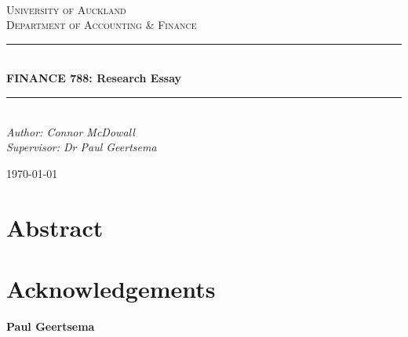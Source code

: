 \documentclass[12pt]{article}
\begin{document}
\begin{titlepage}
	\newcommand{\HRule}{\rule{\linewidth}{0.5mm}} %
	
	\center
	
	
	\textsc{\LARGE }\\[1.5cm] %
	
	\textsc{\Large University of Auckland\\Department of Accounting \& Finance}\\[0.5cm] %
	
	
	\HRule\\[0.5cm]
	
	{\huge\bfseries FINANCE 788: Research Essay}\\[0.4cm] %
	
	\HRule\\[0.5cm]
	
	
	{\large\textit{Author: Connor McDowall \\Supervisor: Dr Paul Geertsema}}\\
	
	
	\vfill\vfill\vfill %
	
	{\large\today} %
	 
	
	\vfill %
	
\end{titlepage}
\newpage
\section*{Abstract}
\newpage
\section*{Acknowledgements}
\begin{center}
	\textbf{Paul Geertsema}
\end{center}
\newpage
\end{document}
